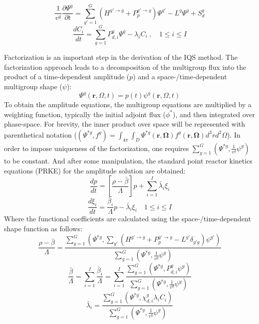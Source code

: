 \documentclass{anstrans}
\renewcommand{\vec}[1]{\bm{#1}} %
\newcommand{\bs}[1]{\mathbf{#1}}
\renewcommand{\div}{\bs{\nabla}\! \cdot \!}
\newcommand{\grad}{\bs{\nabla}}
\newcommand{\be}{\begin{equation}}
\newcommand{\ee}{\end{equation}}
\begin{document}
\be
\frac{1}{v^g}\frac{\partial \Psi^g}{\partial t} = \sum_{g'=1}^G \left(H^{g'\to g} + P_p^{g' \to g} \right) \Psi^{g'} - L^g\Psi^g + S_{d}^g
\label{eq:flux}
\ee 
\be
\frac{dC_i}{dt} = \sum_{g=1}^G P_{d,i}^g \Psi^{g} - \lambda_i C_i \ , \quad 1 \le i \le I 
\label{eq:precursor}
\ee

Factorization is an important step in the derivation of the IQS method. The factorization approach leads to a decomposition of the multigroup flux into the product of a time-dependent amplitude ($p$) and a space-/time-dependent multigroup shape ($\psi$):
\be
\Psi^g(\vec{r},\Omega,t)=p(t)\psi^g(\vec{r},\Omega,t)
\ee
To obtain the amplitude equations, the multigroup equations are multiplied by a weighting function, typically the initial adjoint flux ($\phi^*$), and then integrated over phase-space.  For brevity, the inner product over space will be represented with parenthetical notation ($\left(\Psi^{*g},f^g\right) = \int_{4\pi}\int_D \Psi^{*g}(\vec{r},\vec{\Omega})f^g(\vec{r},\vec{\Omega})d^3r d^2\Omega
$).  In order to impose uniqueness of the factorization, one requires $\sum_{g=1}^G\left(\Psi^{*g},\frac{1}{v^g}\psi^g\right)$ to be constant.  And after some manipulation, the standard point reactor kinetics equations (PRKE) for the amplitude solution are obtained:
\be
\frac{dp}{dt}=\left[\frac{\rho-\bar{\beta}}{\Lambda}\right]p+\sum_{i=1}^I\bar{\lambda}_i\xi_i
\ee
\be
\frac{d\xi_i}{dt}=\frac{\bar{\beta}_i}{\Lambda}p-\bar{\lambda}_i\xi_i \quad 1 \le i \le I 
\ee
Where the functional coefficients are calculated using the space-/time-dependent shape function as follows:
\be
\frac{\rho-\bar{\beta}}{\Lambda}=\frac{ \sum_{g=1}^G\left(\Psi^{*g},\sum_{g'}(H^{g' \to g}+P_p^{g' \to g}-L^{g'}\delta_{g'g})\psi^{g'}\right)}{\sum_{g=1}^G\left(\Psi^{*g},\frac{1}{v^g}\psi^g\right)}
\label{eq:rmb}
\ee
\be
\frac{\bar{\beta}}{\Lambda}=\sum_{i=1}^I\frac{\bar{\beta}_i}{\Lambda}=\sum_{i=1}^I\frac{\sum_{g=1}^G(\Psi^{*g}, P_{d,i}^g \psi^g)}{\sum_{g=1}^G\left(\Psi^{*g},\frac{1}{v^g}\psi^g\right)}
\ee
\be
\bar{\lambda}_i=\frac{\sum_{g=1}^G(\Psi^{*g},\chi_{d,i}^g\lambda_i C_i)}{\sum_{g=1}^G\left(\Psi^{*g},\frac{1}{v^g}\psi^g\right)}
\label{eq:l}
\ee
\end{document}
